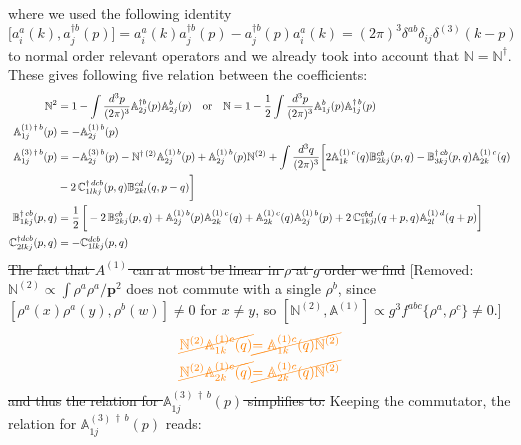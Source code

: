 \documentclass[aps,prd,amsmath,amssymb,nofootinbib]{revtex4-2}
\def\mf#1{\mathbb{#1}}
\def\v#1{\mathbf{#1}}
\numberwithin{equation}{section}
\begin{document}
where we used the following identity
\begin{equation}
    \bigg[a^{a}_{i}(k),a^{\dagger b}_{j}(p)\bigg] = a^{a}_{i}(k)a^{\dagger b}_{j}(p) - a^{\dagger b}_{j}(p)a^{a}_{i}(k)= (2\pi)^{3}\delta^{ab}\delta_{ij}\delta^{(3)}(k-p)
\end{equation}
to normal order relevant operators and we  already took into account that $\mf{N} = \mf{N}^\dagger  $. These gives following five relation between the coefficients: 
\begin{align}
 \mf{N}^{2}  &= 1-  \int \frac{d^{3}p}{(2\pi)^{3}} \mf{A}^{\dagger b}_{2j}(p) \mf{A}^{b}_{2j}(p) \quad
 \text{or} \quad \mf{N}   = 1- \frac{1}{2} \int \frac{d^{3}p}{(2\pi)^{3}} \mf{A}^{b}_{1j}(p) \mf{A}^{\dagger\, b}_{1j}(p) \\ 
 \mf{A}^{(1)\, \dagger\,  b}_{1j}(p) & =  -\mf{A}^{(1)\, b}_{2j}(p) \\  
 \mf{A}^{(3)\, \dagger\, b}_{1j}(p) & = -\mf{A}^{(3)\, b}_{2j}(p)- \mf{N}^{\dagger\, (2)}\mf{A}^{(1)\, b}_{2j}(p) + \mf{A}^{(1)\, b}_{2j}(p)\mf{N}^{(2)} +\int \frac{d^{3}q}{(2\pi)^{3}}\bigg[2\mf{A}^{(1)\, c}_{1k}(q)\mf{B}^{cb}_{2kj}(p,q)-\mf{B}^{\dagger\, cb}_{3kj}(p,q)\mf{A}^{(1)\,c}_{2k}(q)\notag \\ & -2\,\mf{C}^{\dagger\, dcb}_{1lkj}(p,q)\mf{B}^{cd}_{2kl}(q,p-q)\bigg] \\ 
 \mf{B}^{\dagger\, cb}_{1kj}(p,q) & = \frac{1}{2}\,\bigg[-2\,\mf{B}^{cb}_{2kj}(p,q)+\mf{A}^{(1)\, b}_{2j}(p)\mf{A}^{(1)\, c}_{2k}(q)+ \mf{A}^{(1)\, c}_{2k}(q)\mf{A}^{(1)\, b}_{2j}(p)+2\, \mf{C}^{cbd}_{1kjl}(q+p,q)\mf{A}^{(1)\,d}_{2l}(q+p)\bigg]
\\ 
  \mf{C}^{\dagger dcb}_{2lkj}(p,q) & =  -\mf{C}^{dcb}_{1lkj}(p,q)
\end{align}
{\color{orange}\sout{The fact that $A^{(1)}$ can at most be linear in $\rho$ at $g$ order we find}} {\color{red}[Removed: $\mf{N}^{(2)}\propto\int\rho^a\rho^a/\v{p}^2$ does not commute with a single $\rho^b$, since $[\rho^a(x)\rho^a(y),\rho^b(w)]\neq 0$ for $x\neq y$, so $[\mf{N}^{(2)},\mf{A}^{(1)}]\propto g^3 f^{abc}\{\rho^a,\rho^c\}\neq 0$.]} 
\begin{align}
    {\color{orange}\cancel{\mf {N}^{(2)}\mf{A}^{(1)c}_{1k}(q)}} &{\color{orange}\cancel{= \mf{A}^{(1) c}_{1k}(q) \mf {N}^{(2)}}} \\ 
    {\color{orange}\cancel{\mf {N}^{(2)}\mf{A}^{(1)c}_{2k}(q)}} &{\color{orange}\cancel{= \mf{A}^{(1) c}_{2k}(q) \mf {N}^{(2)}}}
\end{align}
{\color{orange}\sout{and thus}} 
{\color{orange}\sout{the relation for $\mf{A}^{(3)\, \dagger\, b}_{1j}(p)$ simplifies to:}} {\color{red}Keeping the commutator, the relation for $\mf{A}^{(3)\, \dagger\, b}_{1j}(p)$ reads:}
\end{document}
